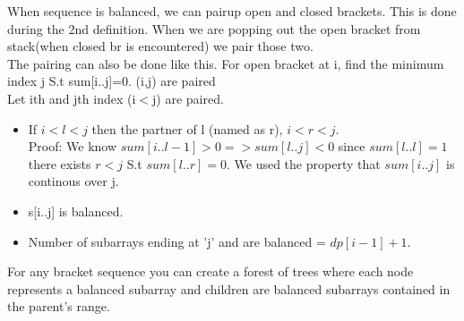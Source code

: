 \documentclass[../Notes.tex]{subfiles}
\begin{document}
When sequence is balanced, we can pairup open and closed brackets. This is done during the 2nd definition. When we are popping out the open bracket from stack(when closed br is encountered) we pair those two.\\

The pairing can also be done like this. For open bracket at i, find the minimum index j S.t sum[i..j]=0. (i,j) are paired\\

Let ith and jth index (i$<$j) are paired.
\begin{itemize}
	\item If $i<l<j$ then the partner of l (named as r), $i<r<j$. \\
	Proof: We know $sum[i..l-1]>0 => sum[l..j]<0$ since $sum[l..l] = 1$ there exists $r<j$ S.t $sum[l..r]=0$. We used the property that $sum[i..j]$ is continous over j.
	\item s[i..j] is balanced.
	\item Number of subarrays ending at 'j' and are balanced =  $dp[i-1]+1$.
\end{itemize}

For any bracket sequence you can create a forest of trees where each node represents a balanced subarray and children are balanced subarrays contained in the parent's range.
\end{document}
